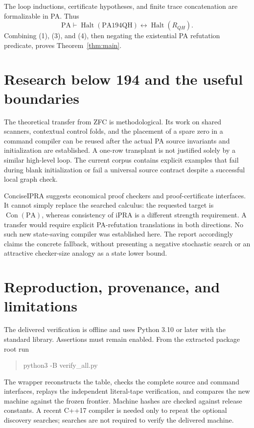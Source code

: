 \documentclass[11pt,letterpaper]{article}
\newcommand{\PA}{\mathrm{PA}}
\newcommand{\Con}{\operatorname{Con}}
\newcommand{\Halt}{\operatorname{Halt}}
\newcommand{\candidate}{\mathrm{PA194QH}}
\begin{document}
The loop inductions, certificate hypotheses, and finite trace concatenation
are formalizable in PA. Thus
\[
             \PA\vdash\Halt(\candidate)\leftrightarrow\Halt(R_{QH}).
\tag{4}
\]
Combining (1), (3), and (4), then negating the existential PA refutation
predicate, proves Theorem~\ref{thm:main}.

\section{Research below 194 and the useful boundaries}
\label{sec:search}



The theoretical transfer from ZFC is methodological. Its work on
shared scanners, contextual control folds, and the placement of a spare
zero in a command compiler can be reused after the actual PA source
invariants and initialization are established. A one-row transplant is
not justified solely by a similar high-level loop. The current corpus
contains explicit examples that fail during blank initialization or fail
a universal source contract despite a successful local graph check.

ConciseIPRA suggests economical proof checkers and proof-certificate
interfaces. It cannot simply replace the searched calculus: the requested
target is $\Con(\PA)$, whereas consistency of iPRA is a different strength
requirement. A transfer would require explicit PA-refutation translations
in both directions. No such new state-saving compiler was established
here. The report accordingly claims the concrete fallback, without
presenting a negative stochastic search or an attractive checker-size
analogy as a state lower bound.

\section{Reproduction, provenance, and limitations}
\label{sec:reproduction}

The delivered verification is offline and uses Python 3.10 or later with
the standard library. Assertions must remain enabled. From the extracted
package root run
\begin{quote}\ttfamily
python3 -B verify\_all.py
\end{quote}
The wrapper reconstructs the table, checks the complete source and command
interfaces, replays the independent literal-tape verification, and compares
the new machine against the frozen frontier. Machine hashes are checked
against release constants. A recent C++17 compiler is needed only to
repeat the optional discovery searches; searches are not required to
verify the delivered machine.
\end{document}
